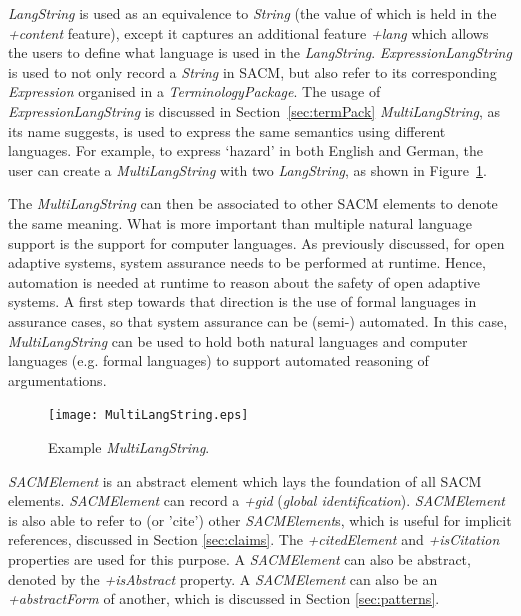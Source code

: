\textit{LangString} is used as an equivalence to \textit{String} (the value of which is held in the \textit{+content} feature), except it captures an additional feature \textit{+lang} which allows the users to define what language is used in the \textit{LangString}. 
\textit{ExpressionLangString} is used to not only record a \textit{String} in SACM, but also refer to its corresponding \textit{Expression} organised in a \textit{TerminologyPackage}. 
The usage of \textit{ExpressionLangString} is discussed in Section~\ref{sec:termPack} \textit{MultiLangString}, as its name suggests, is used to express the same semantics using different languages. 
For example, to express `hazard' in both English and German, the user can create a \textit{MultiLangString} with two \textit{LangString}, as shown in Figure~\ref{fig:mulitiLang}.

The \textit{MultiLangString} can then be associated to other SACM elements to denote the same meaning. 
What is more important than multiple natural language support is the support for computer languages. 
As previously discussed, for open adaptive systems, system assurance needs to be performed at runtime. 
Hence, automation is needed at runtime to reason about the safety of open adaptive systems. 
A first step towards that direction is the use of formal languages in assurance cases, so that system assurance can be (semi-) automated. In this case, \textit{MultiLangString} can be used to hold both natural languages and computer languages (e.g. formal languages) to support automated reasoning of argumentations. 

\begin{figure}
	\centering
	\texttt{[image: MultiLangString.eps]}
	\caption{Example \textit{MultiLangString}.}
	\label{fig:mulitiLang}
\end{figure}

\textit{SACMElement} is an abstract element which lays the foundation of all SACM elements. \textit{SACMElement} can record a \textit{+gid} (\textit{global identification}). 
\textit{SACMElement} is also able to refer to (or 'cite') other \textit{SACMElement}s, which is useful for implicit references, discussed in Section \ref{sec:claims}. 
The \textit{+citedElement} and \textit{+isCitation} properties are used for this purpose. 
A \textit{SACMElement} can also be abstract, denoted by the \textit{+isAbstract} property. 
A \textit{SACMElement} can also be an \textit{+abstractForm} of another, which is discussed in Section \ref{sec:patterns}. 

